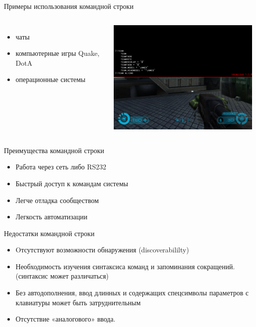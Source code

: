 
\begin{frame}{Примеры использования командной строки}
	\begin{columns}
        \begin{itemize}
            \item чаты
            \item компьютерные игры Quake, DotA
            \item операционные системы
        \end{itemize}
    \includegraphics[height=0.4\textheight]{../../slides/cmdline/330px-Tremulous_console.png}
	\end{columns}
\end{frame}

\begin{frame}{Преимущества командной строки}
	\begin{itemize}
		\item Работа через сеть либо RS232
		\item Быстрый доступ к командам системы
		\item Легче отладка сообществом
		\item Легкость автоматизации
	\end{itemize}
\end{frame}

\begin{frame}{Недостатки командной строки}
	\begin{itemize}
		\item Oтсутствуют возможности обнаружения (discoverabililty)
		\item Необходимость изучения синтаксиса команд и запоминания сокращений.  (синтаксис может различаться)
		\item Без автодополнения, ввод длинных и содержащих спецсимволы параметров с клавиатуры может быть затруднительным
		\item Отсутствие «аналогового» ввода.
	\end{itemize}
\end{frame}

